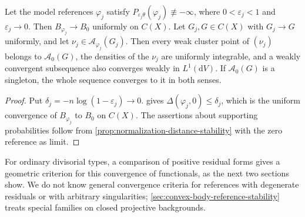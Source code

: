 

\begin{corollary}\label{cor:small-reference-adjoint-limits}
Let the model references $\varphi_j$ satisfy $P_{\varepsilon_j\theta}(\varphi_j)\not\equiv-\infty$, where $0<\varepsilon_j<1$ and $\varepsilon_j\to0$. Then $B_{\varphi_j}\to B_0$ uniformly on $C(X)$. Let $G_j,G\in C(X)$ with $G_j\to G$ uniformly, and let $\nu_j\in\mathcal A_{\varphi_j}(G_j)$. Then every weak cluster point of $(\nu_j)$ belongs to $\mathcal A_0(G)$, the densities of the $\nu_j$ are uniformly integrable, and a weakly convergent subsequence also converges weakly in $L^1(\mathrm{d}V)$. If $\mathcal A_0(G)$ is a singleton, the whole sequence converges to it in both senses.
\end{corollary}
\begin{proof}
Put $\delta_j=-n\log(1-\varepsilon_j)\to0$.  gives $\Delta(\varphi_j,0)\leq\delta_j$, which is the uniform convergence of $B_{\varphi_j}$ to $B_0$ on $C(X)$. The assertions about supporting probabilities follow from \cref{prop:normalization-distance-stability} with the zero reference as limit.
\end{proof}

For ordinary divisorial types, a comparison of positive residual forms gives a geometric criterion for this convergence of functionals, as the next two sections show. We do not know general convergence criteria for references with degenerate residuals or with arbitrary singularities; \cref{sec:convex-body-reference-stability} treats special families on closed projective backgrounds.
